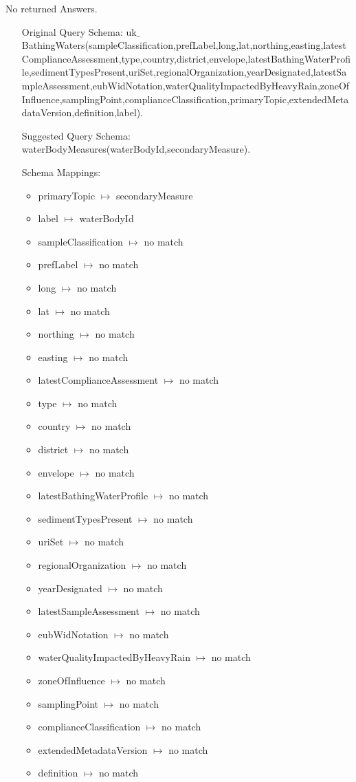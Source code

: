 \documentclass[a4paper,10pt]{article}
\begin{document}
No returned Answers.

\begin{itemize}
\item[Original Query Schema:] uk$\_$BathingWaters(sampleClassification,prefLabel,long,lat,northing,easting,latestComplianceAssessment,type,country,district,envelope,latestBathingWaterProfile,sedimentTypesPresent,uriSet,regionalOrganization,yearDesignated,latestSampleAssessment,eubWidNotation,waterQualityImpactedByHeavyRain,zoneOfInfluence,samplingPoint,complianceClassification,primaryTopic,extendedMetadataVersion,definition,label).


\item[Suggested Query Schema: ]
waterBodyMeasures(waterBodyId,secondaryMeasure).

\item[Schema Mappings:] 
	\begin{itemize}

\item primaryTopic $\mapsto$ secondaryMeasure
\item label $\mapsto$ waterBodyId
\item sampleClassification $\mapsto$ no match 
\item prefLabel $\mapsto$ no match 
\item long $\mapsto$ no match 
\item lat $\mapsto$ no match 
\item northing $\mapsto$ no match 
\item easting $\mapsto$ no match 
\item latestComplianceAssessment $\mapsto$ no match 
\item type $\mapsto$ no match 
\item country $\mapsto$ no match 
\item district $\mapsto$ no match 
\item envelope $\mapsto$ no match 
\item latestBathingWaterProfile $\mapsto$ no match 
\item sedimentTypesPresent $\mapsto$ no match 
\item uriSet $\mapsto$ no match 
\item regionalOrganization $\mapsto$ no match 
\item yearDesignated $\mapsto$ no match 
\item latestSampleAssessment $\mapsto$ no match 
\item eubWidNotation $\mapsto$ no match 
\item waterQualityImpactedByHeavyRain $\mapsto$ no match 
\item zoneOfInfluence $\mapsto$ no match 
\item samplingPoint $\mapsto$ no match 
\item complianceClassification $\mapsto$ no match 
\item extendedMetadataVersion $\mapsto$ no match 
\item definition $\mapsto$ no match 


	\end{itemize}

\end{itemize}
\end{document}
